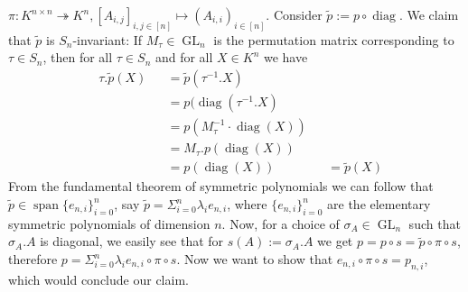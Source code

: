 \begin{dexample}
  $\pi \colon K^{n \times n} \twoheadrightarrow K^n , [A_{i,j}]_{i,j \in [n]} \longmapsto (A_{i,i})_{i \in [n]} $.
  Consider $\tilde{p} := p \circ \operatorname{diag}$.
  We claim that $\tilde{p}$ is $S_n$-invariant:
  If $M_\tau \in \operatorname{GL}_n$ is the permutation matrix corresponding to $\tau \in S_n$, then for all $\tau \in S_n$ and for all $ X \in K^n$ we have
  \begin{equation}
    \begin{aligned}
      &\tau.\tilde{p} (X) &&= \tilde{p} (\tau^{-1}.X)\\
      &&&= p ( \operatorname{diag}(\tau^{-1}.X)\\
      &&&= p( M_\tau^{-1} \cdot \operatorname{diag} (X))\\
      &&&= M_\tau . p (\operatorname{diag}(X))\\
      &&&= p (\operatorname{diag}(X))&&= \tilde{p} (X)
    \end{aligned}
  \end{equation}
  From the fundamental theorem of symmetric polynomials we can follow that $\tilde{p} \in \operatorname{span}\{e_{n,i}\}_{i=0}^n$, say $\tilde{p} = \Sigma_{i=0}^n \lambda_i e_{n,i}$, where $\{ e_{n,i} \}_{i=0}^n$ are the elementary symmetric polynomials of dimension $n$.
  Now, for a choice of $\sigma_A \in \operatorname{GL}_n$ such that $\sigma_A . A$ is diagonal, we easily see that for $s(A) := \sigma_A . A$ we get $p = p \circ s = \tilde{p} \circ \pi \circ s$, therefore $p = \Sigma_{i=0}^n \lambda_i e_{n,i} \circ \pi \circ s$.
  Now we want to show that $e_{n,i} \circ \pi \circ s = p_{n,i}$, which would conclude our claim.

\end{dexample}
